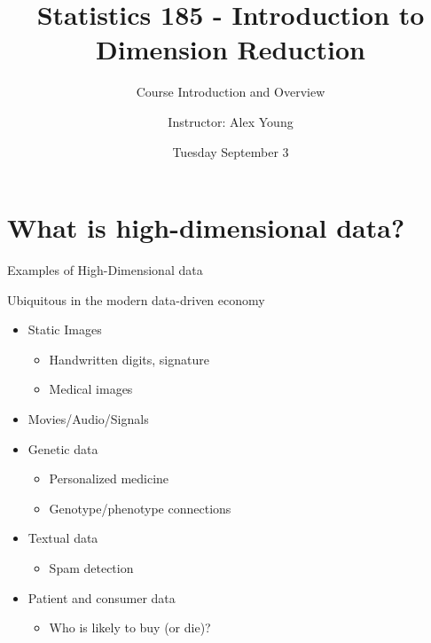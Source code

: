 \documentclass{beamer}
\title[Stat 185 - Overview]{Statistics 185 - Introduction to Dimension Reduction}
\subtitle{Course Introduction and Overview}
\author{Instructor: Alex Young}
\date{Tuesday September 3}
\begin{document}
\begin{frame}
\titlepage
\end{frame}

\section{What is high-dimensional data?}
\begin{frame}{Examples of High-Dimensional data}
\begin{block}{Ubiquitous in the modern data-driven economy}
\begin{itemize}
\item Static Images
\begin{itemize}
	\item Handwritten digits, signature
	\item Medical images
\end{itemize}
\item Movies/Audio/Signals
\item Genetic data
	\begin{itemize}
		\item Personalized medicine
		\item Genotype/phenotype connections
	\end{itemize}
\item Textual data
\begin{itemize}
	\item Spam detection
\end{itemize}
\item Patient and consumer data
\begin{itemize}
	\item Who is likely to buy (or die)?
\end{itemize}
\end{itemize}
\end{block}

\end{frame}
\end{document}
